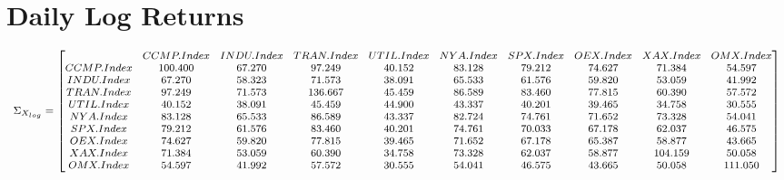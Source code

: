 \documentclass{article}
\begin{document}
\section*{Daily Log Returns}
\begin{equation*}
\begin{medsize}
\Sigma_{X_{log}}=\begin{bmatrix}{}
  & CCMP.Index & INDU.Index & TRAN.Index & UTIL.Index & NYA.Index & SPX.Index & OEX.Index & XAX.Index & OMX.Index \\ 
 CCMP.Index & 100.400 & 67.270 & 97.249 & 40.152 & 83.128 & 79.212 & 74.627 & 71.384 & 54.597 \\ 
  INDU.Index & 67.270 & 58.323 & 71.573 & 38.091 & 65.533 & 61.576 & 59.820 & 53.059 & 41.992 \\ 
  TRAN.Index & 97.249 & 71.573 & 136.667 & 45.459 & 86.589 & 83.460 & 77.815 & 60.390 & 57.572 \\ 
  UTIL.Index & 40.152 & 38.091 & 45.459 & 44.900 & 43.337 & 40.201 & 39.465 & 34.758 & 30.555 \\ 
  NYA.Index & 83.128 & 65.533 & 86.589 & 43.337 & 82.724 & 74.761 & 71.652 & 73.328 & 54.041 \\ 
  SPX.Index & 79.212 & 61.576 & 83.460 & 40.201 & 74.761 & 70.033 & 67.178 & 62.037 & 46.575 \\ 
  OEX.Index & 74.627 & 59.820 & 77.815 & 39.465 & 71.652 & 67.178 & 65.387 & 58.877 & 43.665 \\ 
  XAX.Index & 71.384 & 53.059 & 60.390 & 34.758 & 73.328 & 62.037 & 58.877 & 104.159 & 50.058 \\ 
  OMX.Index & 54.597 & 41.992 & 57.572 & 30.555 & 54.041 & 46.575 & 43.665 & 50.058 & 111.050 \\ 
  \end{bmatrix}
\end{medsize}
\end{equation*}
\end{document}
